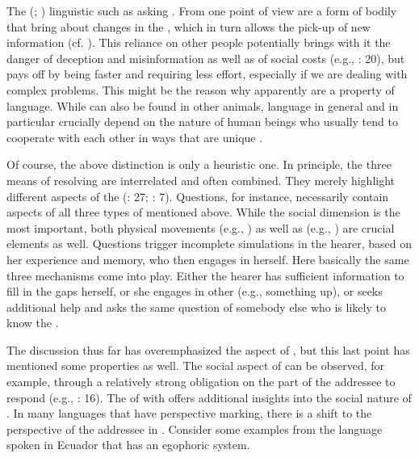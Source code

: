 \noindent The  \textit{} (\citealt{Lewin1936}; \citealt{Gibson1979}) linguistic  such as asking . From one point of view  are a form of bodily  that bring about changes in the , which in turn allows the pick-up of new information (cf. \citealt{SwensonTurvey1991}). This reliance on other people potentially brings with it the danger of deception and misinformation as well as of social costs (e.g., \citealt{Levinson2012b}: 20), but pays off by being faster and requiring less effort, especially if we are dealing with complex problems. This might be the reason why  apparently are a  property of language. While  can also be found in other animals, language in general and  in particular crucially depend on the \textit{} nature of human beings who usually tend to cooperate with each other in ways that are unique \citep{Tomasello2014b}.

Of course, the above distinction is only a heuristic one. In principle, the three means of resolving  are interrelated and often combined. They merely highlight different aspects of the  (\citealt{Lewin1936}: 27; \citealt{SteffensenFill2014}: 7). Questions, for instance, necessarily contain aspects of all three types of  mentioned above. While the social dimension is the most important, both physical movements (e.g., ) as well as  (e.g., ) are crucial elements as well. Questions trigger incomplete simulations in the hearer, based on her experience and memory, who then engages in  herself. Here basically the same three mechanisms come into play. Either the hearer has sufficient information to fill in the gaps herself, or she engages in other  (e.g.,  something up), or seeks additional help and asks the same question of somebody else who is likely to know the .

The discussion thus far has overemphasized the  aspect of , but this last point has mentioned some  properties as well. The social aspect of  can be observed, for example, through a relatively strong obligation on the part of the addressee to respond (e.g., \citealt{Levinson2012b}: 16). The  of  with  offers additional insights into the social nature of . In many languages that have perspective marking, there is a shift to the perspective of the addressee in . Consider some examples from the  language spoken in Ecuador that has an egophoric system.

